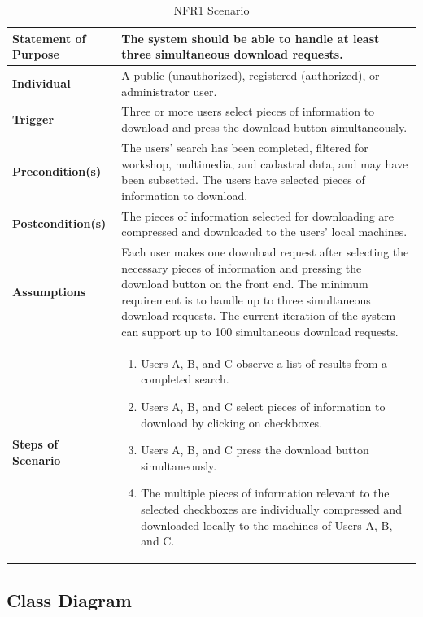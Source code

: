 \documentclass{article}
\begin{document}
\begin{table}[H]
	\caption{NFR1 Scenario}
	\begin{tabularx}{\textwidth}{|l|X|}
		\hline
		\textbf{Statement of Purpose} & The system should be able to handle at least three
        simultaneous download requests. \\ \hline
		\textbf{Individual} & A public (unauthorized), registered (authorized), or administrator user. \\ \hline
		\textbf{Trigger}  & Three or more users select pieces of information to download and press 
        the download button simultaneously. \\ \hline
		\textbf{Precondition(s)}  & The users' search has been completed, filtered for workshop, multimedia, and cadastral data, and may have been subsetted. The users have selected pieces of information to 
        download. \\ \hline
		\textbf{Postcondition(s)}  & The pieces of information selected for downloading are compressed and 
        downloaded to the users' local machines.  \\ \hline
		\textbf{Assumptions} & Each user makes one download request after selecting the necessary pieces of 
        information and pressing the download button on the front end. The minimum requirement is to handle 
        up to three simultaneous download requests. The current iteration of the system can support up to 
        100 simultaneous download requests. \\ \hline
		\textbf{Steps of Scenario} & 
		\begin{enumerate}
				\item Users A, B, and C observe a list of results from a completed search.
				\item Users A, B, and C select pieces of information to download by clicking on checkboxes.
				\item Users A, B, and C press the download button simultaneously.
				\item The multiple pieces of information relevant to the selected checkboxes are individually 
                compressed and downloaded locally to the machines of Users A, B, and C.
			\end{enumerate}  \\  \hline
	\end{tabularx}
\end{table}

\clearpage

\subsection{Class Diagram}
\end{document}
